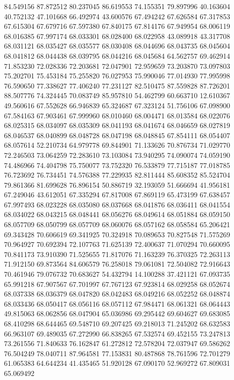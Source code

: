 84.549156
87.872512
80.237045
86.619553
74.155351
79.897996
40.163604
40.752132
47.101668
66.492974
43.600576
67.494242
67.626584
67.317853
67.615304
67.679716
67.597380
67.840175
67.814176
67.949954
68.006119
68.016385
67.997174
68.033301
68.028400
68.022958
43.089918
43.317708
68.031121
68.035427
68.035577
68.030408
68.044696
68.043735
68.045604
68.041812
68.044438
68.039795
68.044216
68.045684
64.562757
69.462914
71.853230
72.028336
72.203681
72.047901
72.959659
73.203870
73.097803
75.202701
75.453184
75.255820
76.027953
75.990046
77.014930
77.995998
76.590650
77.338627
77.406240
77.231127
82.510475
87.559828
87.726201
88.507776
74.324445
70.083749
85.957810
54.462799
60.663710
12.610367
49.560616
67.552628
66.946839
65.324687
67.323124
51.756106
67.098900
67.584163
67.903461
67.999960
68.010460
68.004471
68.013584
68.022076
68.025315
68.034097
68.035309
68.041193
68.041674
68.046659
68.027819
68.046537
68.040899
68.048728
68.047198
68.048845
67.854111
68.054407
68.057614
52.210734
64.979778
69.844901
71.133626
70.876734
71.029770
72.246503
73.064259
72.283610
73.103084
73.940295
74.090074
74.059190
74.486966
74.404798
75.750077
73.752320
76.533879
77.715187
77.018785
76.723692
76.734451
74.576388
77.229935
82.811444
85.608352
85.524704
79.861366
81.699628
76.896154
50.886719
32.193059
51.666694
41.956181
67.249046
43.612051
67.335294
67.817008
67.869119
65.473199
67.638457
67.997493
68.023228
68.035080
68.037668
68.041876
68.036411
68.041554
68.034022
68.043215
68.048441
68.056276
68.049614
68.051884
68.059150
68.057709
68.050799
68.057709
68.060076
68.057162
68.058584
65.206421
69.343428
70.606619
69.341925
70.324918
70.089653
70.827548
71.575269
70.964927
70.692394
72.107763
71.625139
72.400637
71.070294
70.660095
70.841173
73.910390
71.525655
71.817076
71.163239
76.370325
72.263113
71.912150
69.873564
84.606579
76.258018
79.061081
72.504082
72.916643
70.461946
79.076732
70.683627
54.432794
14.100288
37.421121
67.093735
65.991218
67.907567
67.701997
67.767123
67.923814
68.029258
68.052674
68.037338
68.036379
68.047820
68.042483
68.049216
68.052252
68.048874
68.033436
68.050417
68.056116
68.057112
67.984471
68.061321
68.064443
49.815063
68.062856
68.047904
65.036986
69.295442
69.604627
69.683085
68.410298
68.644465
69.548710
69.207425
69.218013
71.245202
68.632583
66.963107
69.489035
67.272990
66.838265
67.532574
69.452155
73.247813
73.261556
71.840633
76.162847
61.272812
72.578204
72.037947
69.586262
76.504249
78.040711
87.964581
77.153831
80.487868
78.761596
72.701279
61.065383
64.644234
41.435465
51.920128
67.090170
52.969272
67.809031
65.069492
